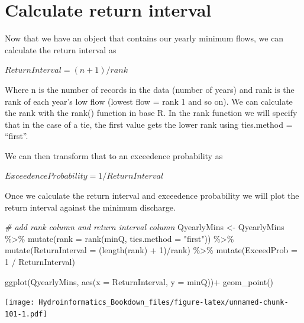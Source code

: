\documentclass[
]{book}
\newenvironment{Shaded}{\begin{snugshade}}{\end{snugshade}}
\newcommand{\AttributeTok}[1]{\textcolor[rgb]{0.77,0.63,0.00}{#1}}
\newcommand{\CommentTok}[1]{\textcolor[rgb]{0.56,0.35,0.01}{\textit{#1}}}
\newcommand{\DecValTok}[1]{\textcolor[rgb]{0.00,0.00,0.81}{#1}}
\newcommand{\FunctionTok}[1]{\textcolor[rgb]{0.00,0.00,0.00}{#1}}
\newcommand{\NormalTok}[1]{#1}
\newcommand{\OtherTok}[1]{\textcolor[rgb]{0.56,0.35,0.01}{#1}}
\newcommand{\SpecialCharTok}[1]{\textcolor[rgb]{0.00,0.00,0.00}{#1}}
\newcommand{\StringTok}[1]{\textcolor[rgb]{0.31,0.60,0.02}{#1}}
\begin{document}
\hypertarget{calculate-return-interval}{%
\section{Calculate return interval}\label{calculate-return-interval}}

Now that we have an object that contains our yearly minimum flows, we can calculate the return interval as

\(Return Interval = (n + 1) / rank\)

Where n is the number of records in the data (number of years) and rank is the rank of each year's low flow (lowest flow = rank 1 and so on). We can calculate the rank with the rank() function in base R. In the rank function we will specify that in the case of a tie, the first value gets the lower rank using ties.method = ``first''.

We can then transform that to an exceedence probability as

\(Exceedence Probability = 1 / Return Interval\)

Once we calculate the return interval and exceedence probability we will plot the return interval against the minimum discharge.

\begin{Shaded}
\begin{Highlighting}[]
\CommentTok{\# add rank column and return interval column}
\NormalTok{QyearlyMins }\OtherTok{\textless{}{-}}\NormalTok{ QyearlyMins }\SpecialCharTok{\%\textgreater{}\%} 
                \FunctionTok{mutate}\NormalTok{(}\AttributeTok{rank =} \FunctionTok{rank}\NormalTok{(minQ, }\AttributeTok{ties.method =} \StringTok{"first"}\NormalTok{)) }\SpecialCharTok{\%\textgreater{}\%}
                \FunctionTok{mutate}\NormalTok{(}\AttributeTok{ReturnInterval =}\NormalTok{ (}\FunctionTok{length}\NormalTok{(rank) }\SpecialCharTok{+} \DecValTok{1}\NormalTok{)}\SpecialCharTok{/}\NormalTok{rank) }\SpecialCharTok{\%\textgreater{}\%}
                \FunctionTok{mutate}\NormalTok{(}\AttributeTok{ExceedProb =} \DecValTok{1} \SpecialCharTok{/}\NormalTok{ ReturnInterval)}
      
\FunctionTok{ggplot}\NormalTok{(QyearlyMins, }\FunctionTok{aes}\NormalTok{(}\AttributeTok{x =}\NormalTok{ ReturnInterval, }\AttributeTok{y =}\NormalTok{ minQ))}\SpecialCharTok{+}
  \FunctionTok{geom\_point}\NormalTok{()}
\end{Highlighting}
\end{Shaded}

\texttt{[image: Hydroinformatics\_Bookdown\_files/figure-latex/unnamed-chunk-101-1.pdf]}
\end{document}

